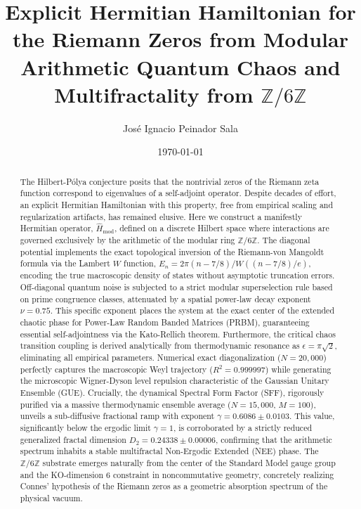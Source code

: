\documentclass[aps,prl,preprint,superscriptaddress,floatfix]{revtex4-2}
\newcommand{\Zmod}{\mathbb{Z}/6\mathbb{Z}}
\begin{document}
\title{Explicit Hermitian Hamiltonian for the Riemann Zeros from Modular Arithmetic Quantum Chaos and Multifractality from \texorpdfstring{$\Zmod$}{Z/6Z}}

\author{José Ignacio Peinador Sala }

\date{\today}

\begin{abstract}
The Hilbert-P\'olya conjecture posits that the nontrivial zeros of the Riemann zeta function correspond to eigenvalues of a self-adjoint operator. Despite decades of effort, an explicit Hermitian Hamiltonian with this property, free from empirical scaling and regularization artifacts, has remained elusive. Here we construct a manifestly Hermitian operator, $\hat{H}_{\text{mod}}$, defined on a discrete Hilbert space where interactions are governed exclusively by the arithmetic of the modular ring $\mathbb{Z}/6\mathbb{Z}$. The diagonal potential implements the exact topological inversion of the Riemann-von Mangoldt formula via the Lambert $W$ function, $E_n = 2\pi (n - 7/8) / W((n - 7/8)/e)$, encoding the true macroscopic density of states without asymptotic truncation errors. Off-diagonal quantum noise is subjected to a strict modular superselection rule based on prime congruence classes, attenuated by a spatial power-law decay exponent $\nu = 0.75$. This specific exponent places the system at the exact center of the extended chaotic phase for Power-Law Random Banded Matrices (PRBM), guaranteeing essential self-adjointness via the Kato-Rellich theorem. Furthermore, the critical chaos transition coupling is derived analytically from thermodynamic resonance as $\epsilon = \pi \sqrt{2}$, eliminating all empirical parameters. Numerical exact diagonalization ($N=20,000$) perfectly captures the macroscopic Weyl trajectory ($R^2 = 0.999997$) while generating the microscopic Wigner-Dyson level repulsion characteristic of the Gaussian Unitary Ensemble (GUE). Crucially, the dynamical Spectral Form Factor (SFF), rigorously purified via a massive thermodynamic ensemble average ($N=15,000$, $M=100$), unveils a sub-diffusive fractional ramp with exponent $\gamma = 0.6086 \pm 0.0103$. This value, significantly below the ergodic limit $\gamma=1$, is corroborated by a strictly reduced generalized fractal dimension $D_2 = 0.24338 \pm 0.00006$, confirming that the arithmetic spectrum inhabits a stable multifractal Non-Ergodic Extended (NEE) phase. The $\Zmod$ substrate emerges naturally from the center of the Standard Model gauge group and the KO-dimension 6 constraint in noncommutative geometry, concretely realizing Connes' hypothesis of the Riemann zeros as a geometric absorption spectrum of the physical vacuum.
\end{abstract}
\end{document}
